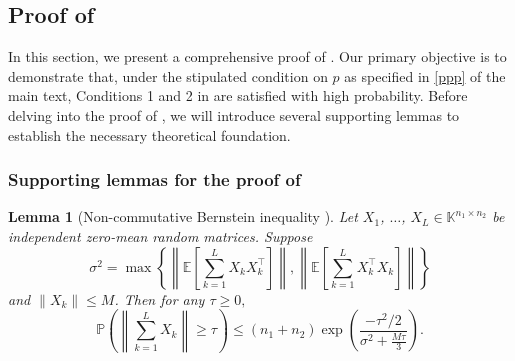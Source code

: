 \documentclass[twoside,12pt]{article}
\newtheorem{lemma}{Lemma}
\begin{document}
\subsection{Proof of } 
In this section, we present a comprehensive proof of . Our primary objective is to  demonstrate that, under the stipulated condition on $p$ as specified in \eqref{ppp} of the main text, Conditions 1 and 2 in  are satisfied with high probability. Before delving into the proof of , we will introduce several supporting lemmas to establish the necessary theoretical foundation.
\subsubsection{\textnormal{Supporting lemmas for the proof of }}\label{usefullemmathm1}
\begin{lemma}[Non-commutative Bernstein inequality \citep{Tropp2010UserFriendly}] \label{thm:tropp}  
Let $X_1$,  $\dots$, $X_{L}\in\mathbb{K}^{n_1\times n_2}$ be independent zero-mean random matrices. Suppose $$\sigma^2=\max\left\{\left\|\mathbb{E}[\sum\limits_{k=1}^{L}X_{k}X_{k}^{\top}]\right\|,\left\|\mathbb{E}[\sum\limits_{k=1}^{L}X_{k}^{\top}X_{k}]\right\|\right\}$$ and $\left\|X_{k}\right\|\leq M$. Then for any $\tau \geq 0,$
$$
\mathbb{P}\left(\left\|\sum\limits_{k=1}^{L}X_{k}\right\|\geq \tau\right)\leq (n_1+n_2)\exp\left(\frac{-\tau^2/2}{\sigma^2+\frac{M\tau}{3}}\right).
$$
\end{lemma}
 
\end{document}
